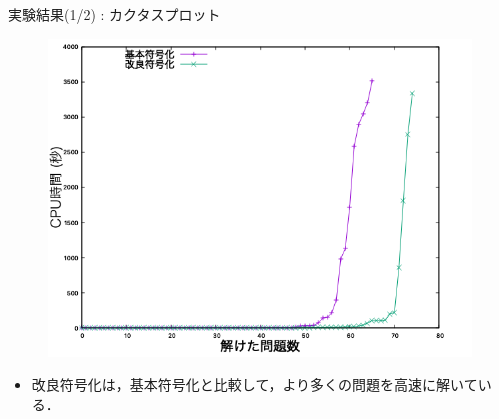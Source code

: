 \documentclass[dvipdfmx,11pt]{beamer}
\begin{document}
\begin{frame}{実験結果(1/2) : カクタスプロット}
 \begin{figure}[h]
  \centering
  \includegraphics[scale=0.38]{fig/cactus.png}
 \end{figure}\vfill

\begin{itemize}
 \item 改良符号化は，基本符号化と比較して，より多くの問題を高速に解いている．
\end{itemize}
\end{frame}
\end{document}

